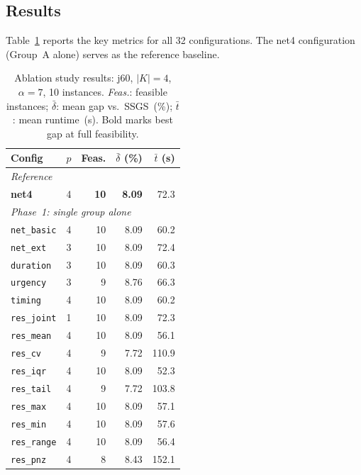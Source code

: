 \subsection{Results}
\label{subsec:ablation_results}
Table~\ref{tab:comp_ablation} reports the key metrics for
all 32 configurations. The net4 configuration (Group~A alone)
serves as the reference baseline.
\begin{table}[htbp]
\centering
\renewcommand{\arraystretch}{1.25}
\caption{Ablation study results: j60, $|K|=4$,
         $\alpha=7$, 10 instances.
         \emph{Feas.}: feasible instances;
         $\bar{\delta}$: mean gap vs.\ SSGS~(\%);
         $\bar{t}$: mean runtime~(s).
         Bold marks best gap at full feasibility.}
\label{tab:comp_ablation}
\begin{tabular}{l r r r r}
\hline
\textbf{Config} & $p$ &
\textbf{Feas.} &
$\bar{\delta}$ (\%) &
$\bar{t}$ (s) \\
\hline
\multicolumn{5}{l}{\emph{Reference}} \\
\textbf{net4}                & 4  & \textbf{10} & \textbf{8.09} & 72.3 \\
\hline
\multicolumn{5}{l}{\emph{Phase~1: single group alone}} \\
\texttt{net\_basic}          & 4  & 10 & 8.09 & 60.2 \\
\texttt{net\_ext}            & 3  & 10 & 8.09 & 72.4 \\
\texttt{duration}            & 3  & 10 & 8.09 & 60.3 \\
\texttt{urgency}             & 3  &  9 & 8.76 & 66.3 \\
\texttt{timing}              & 4  & 10 & 8.09 & 60.2 \\
\texttt{res\_joint}          & 1  & 10 & 8.09 & 72.3 \\
\texttt{res\_mean}           & 4  & 10 & 8.09 & 56.1 \\
\texttt{res\_cv}             & 4  &  9 & 7.72 & 110.9 \\
\texttt{res\_iqr}            & 4  & 10 & 8.09 & 52.3 \\
\texttt{res\_tail}           & 4  &  9 & 7.72 & 103.8 \\
\texttt{res\_max}            & 4  & 10 & 8.09 & 57.1 \\
\texttt{res\_min}            & 4  & 10 & 8.09 & 57.6 \\
\texttt{res\_range}          & 4  & 10 & 8.09 & 56.4 \\
\texttt{res\_pnz}            & 4  &  8 & 8.43 & 152.1 \\

\end{tabular}
\end{table}
